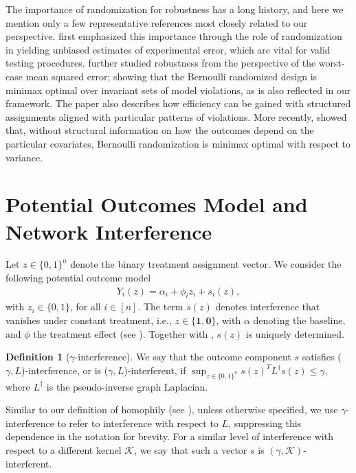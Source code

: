 \documentclass[12pt]{article}
\theoremstyle{definition}
\newtheorem{definition}{Definition}
\numberwithin{equation}{section}
\numberwithin{figure}{section}
\numberwithin{equation}{section}
\numberwithin{figure}{section}
\begin{document}
The importance of randomization for robustness has a long history, and here we mention only a few representative references most closely related to our perspective. \citet{fisher1925statistical, fisher1935design} first emphasized this importance through the role of randomization in yielding unbiased estimates of experimental error, which are vital for valid testing procedures. \citet{wu1981robustness} further studied robustness from the perspective of the worst-case mean squared error; showing that the Bernoulli randomized design is minimax optimal over invariant sets of model violations, as is also reflected in our framework. The paper also describes how efficiency can be gained with structured assignments aligned with particular patterns of violations. More recently, \citet{kallus2018optimal} showed that, without structural information on how the outcomes depend on the particular covariates, Bernoulli randomization is minimax optimal with respect to variance.


\section{Potential Outcomes Model and Network Interference} \label{section:interference}
Let $z \in \{0, 1\}^n$ denote the binary treatment assignment vector. We consider the following potential outcome model
\begin{align} \label{potential_outcome_model}
    Y_i(z) = \alpha_i + \phi_i z_i + {s_{i}}(z),
\end{align} with $z_i \in \{0, 1\}$, for all $i \in [n]$. The term $s(z)$ denotes interference that vanishes under constant treatment, i.e., $z \in \{\mathbf{1}, \mathbf{0}\}$, with $\alpha$ denoting the baseline, and $\phi$ the treatment effect (see ). Together with , $s(z)$ is uniquely determined.

\begin{definition}[$\gamma$-interference] \label{gamma-interference}
We say that the outcome component $s$ satisfies ($\gamma, L$)-interference, or is ($\gamma, L$)-interferent, if $\sup_{z \in \{0,1\}^n} s(z)^TL^{\dagger}s(z) \leq \gamma$, where $L^{\dagger}$ is the pseudo-inverse graph Laplacian.
\end{definition}

\begin{remark}
Similar to our definition of homophily (see ), unless otherwise specified, we use $\gamma$-interference to refer to interference with respect to $L$, suppressing this dependence in the notation for brevity. For a similar level of interference with respect to a different kernel $\mathcal{K}$, we say that such a vector $s$ is $(\gamma, \mathcal{K})$-interferent.
\end{remark}
\end{document}
